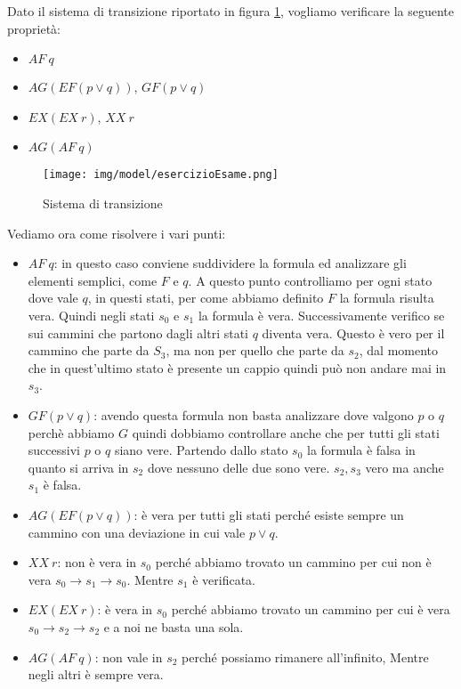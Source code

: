 \begin{esempio} 
    Dato il sistema di transizione riportato in figura \ref{fig:esercizioEsame},
    vogliamo verificare la seguente proprietà:
    \begin{itemize}
        \item $AF \ q$
        \item $AG (EF (p \lor q))$, $GF(p \lor q)$
        \item $EX (EX \ r)$, $XX \ r$
        \item $AG (AF \ q)$
    \end{itemize}
    \begin{figure}[!ht]
        \centering
        \texttt{[image: img/model/esercizioEsame.png]}
        \caption{Sistema di transizione}
        \label{fig:esercizioEsame}
    \end{figure}
    Vediamo ora come risolvere i vari punti:
    \begin{itemize}
        \item $AF \ q$: in questo caso conviene suddividere la formula ed
              analizzare gli elementi semplici, come $F$ e $q$. A questo punto
              controlliamo per ogni stato dove vale $q$, in questi stati, per
              come abbiamo definito $F$ la formula risulta vera. Quindi negli
              stati $s_0$ e $s_1$ la formula è vera. Successivamente verifico se
              sui cammini che partono dagli altri stati $q$ diventa vera. Questo
              è vero per il cammino che parte da $S_3$, ma non per quello che parte
              da $s_2$, dal momento che in quest'ultimo stato è presente un
              cappio quindi può non andare mai in $s_3$.
        \item $GF(p \lor q)$: avendo questa formula non basta analizzare dove
              valgono $p$ o $q$ perchè abbiamo $G$ quindi dobbiamo controllare
              anche che per tutti gli stati successivi $p$ o $q$ siano vere.
              Partendo dallo stato $s_0$ la formula è falsa in quanto si arriva
              in $s_2$ dove nessuno delle due sono vere. $s_2,s_3$ vero ma anche
              $s_1$ è falsa. %
        \item $AG (EF (p \lor q))$: è vera per tutti gli stati perché esiste
              sempre un cammino con una deviazione in cui vale $p \lor q$.
        \item $XX \ r$: non è vera in $s_0$ perché abbiamo trovato un cammino
              per cui non è vera $s_0\to s_1\to s_0$. Mentre $s_1$ è verificata.
        \item $EX (EX \ r)$: è vera in $s_0$ perché abbiamo trovato un cammino
              per cui è vera $s_0\to s_2\to s_2$ e a noi ne basta una sola.
        \item $AG (AF \ q)$: non vale in $s_2$ perché possiamo rimanere
              all'infinito, Mentre negli altri è sempre vera.
    \end{itemize}
\end{esempio}
